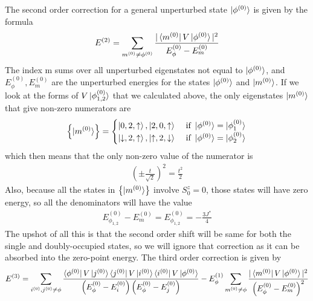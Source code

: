 \documentclass[12pt,twoside]{report}
\numberwithin{equation}{section}
\begin{document}
The second order correction for a general unperturbed state \(\ket{\phi^{(0)}}\) is given by the formula
\begin{equation}\begin{aligned}
	E^{(2)} = \sum_{m^{(0)}\neq\phi^{(0)}}\frac{|\bra{m^{(0)}}V\ket{\phi^{(0)}}|^2}{E^{(0)}_\phi - E^{(0)}_m}
\end{aligned}\end{equation}
The index m sums over all unperturbed eigenstates not equal to \(\ket{\phi^{(0)}}\), and \(E^{(0)}_\phi, E^{(0)}_m\) are the unperturbed energies for the states \(\ket{\phi^{(0)}}\) and \(\ket{m^{(0)}}\). If we look at the forms of \(V\ket{\phi_{1,2}^{(0)}}\) that we calculated above, the only eigenstates \(\ket{m^{(0)}}\) that give non-zero numerators are
\begin{equation}\begin{aligned}
	\left\{\ket{m^{(0)}}\right\} = \begin{cases}
		\ket{0, 2 ,\uparrow}, \ket{2, 0, \uparrow} & \text{ if }\ket{\phi^{(0)}} = \ket{\phi_1^{(0)}} \\
		\ket{\downarrow, 2 ,\uparrow}, \ket{\uparrow, 2, \downarrow} & \text{ if }\ket{\phi^{(0)}} = \ket{\phi_2^{(0)}}\\
	\end{cases}
\end{aligned}\end{equation}
which then means that the only non-zero value of the numerator is
\begin{equation}\begin{aligned}
	\left( \pm \frac{t}{\sqrt 2} \right) ^2 = \frac{t^2}{2}
\end{aligned}\end{equation}
Also, because all the states in \(\left\{ \ket{m^{(0)}} \right\} \) involve \(S_0^z = 0\), those states will have zero energy, so all the denominators will have the value
\begin{equation}\begin{aligned}
	E_{\phi_{1,2}}^{(0)} - E_m^{(0)} = E_{\phi_{1,2}}^{(0)} = -\frac{3J^*}{4}
\end{aligned}\end{equation}
The upshot of all this is that the second order shift will be same for both the single and doubly-occupied states, so we will ignore that correction as it can be absorbed into the zero-point energy.
\pb The third order correction is given by
\begin{equation}\begin{aligned}
	E^{(3)} = \sum_{i^{(0)}, j^{(0)}\neq\phi}\frac{\bra{\phi^{(0)}}V\ket{j^{(0)}}\bra{j^{(0)}}V\ket{i^{(0)}}\bra{i^{(0)}}V\ket{\phi^{(0)}}}{\left(E^{(0)}_\phi - E^{(0)}_i\right)\left(E^{(0)}_\phi - E^{(0)}_j\right)} - E_\phi^{(1)}\sum_{m^{(0)}\neq\phi}\frac{|\bra{m^{(0)}}V\ket{\phi^{(0)}}|^2}{\left(E^{(0)}_\phi - E^{(0)}_m\right)^2}
\end{aligned}\end{equation}
\end{document}

